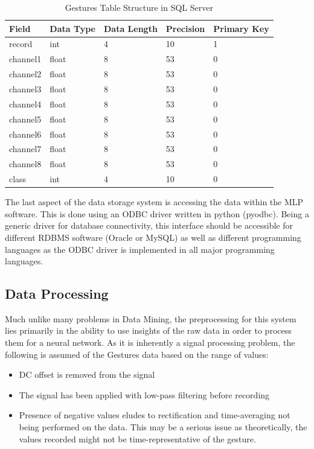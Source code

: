 \documentclass[11pt]{article}
\begin{document}
	\begin{table}[H]
		\centering
		\caption{Gestures Table Structure in SQL Server}
		\begin{tabular}{l|llll}\hline	
			Field    & Data Type & Data Length & Precision & Primary Key \\\hline
			record   & int       & 4           & 10        & 1           \\
			channel1 & float     & 8           & 53        & 0           \\
			channel2 & float     & 8           & 53        & 0           \\
			channel3 & float     & 8           & 53        & 0           \\
			channel4 & float     & 8           & 53        & 0           \\
			channel5 & float     & 8           & 53        & 0           \\
			channel6 & float     & 8           & 53        & 0           \\
			channel7 & float     & 8           & 53        & 0           \\
			channel8 & float     & 8           & 53        & 0           \\
			class    & int       & 4           & 10        & 0           \\\hline\hline
		\end{tabular}
	\end{table}

	\noindent
	The last aspect of the data storage system is accessing the data within the MLP software. This is done using an ODBC driver written in python (pyodbc). Being a generic driver for database connectivity, this interface should be accessible for different RDBMS software (Oracle or MySQL) as well as different programming languages as the ODBC driver is implemented in all major programming languages.

	\subsection{Data Processing}
	Much unlike many problems in Data Mining, the preprocessing for this system lies primarily in the ability to use insights of the raw data in order to process them for a neural network. As it is inherently a signal processing problem\cite{emg_analysis}, the following is assumed of the Gestures data based on the range of values:
	
	\begin{itemize}
		\item DC offset is removed from the signal
		\item The signal has been applied with low-pass filtering before recording
		\item Presence of negative values eludes to rectification and time-averaging not being performed on the data. This may be a serious issue as theoretically, the values recorded might not be time-representative of the gesture.
	\end{itemize}
\end{document}
